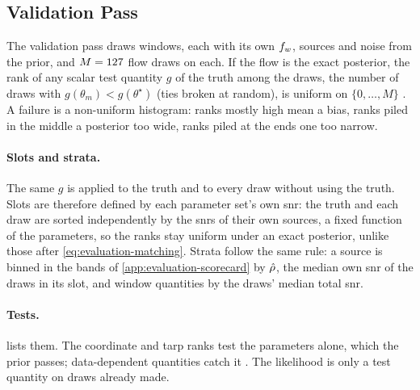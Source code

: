 \subsection{Validation Pass}
\label{app:evaluation-validation}

The validation pass draws \EvaluationValidation{} windows, each with its own $f_{w}$, sources and noise from the prior,
and $M = 127$ flow draws on each. If the flow is the exact posterior, the rank of any scalar test
quantity $g$ of the truth among the draws, the number of draws with $g(\theta_m) < g(\theta^\star)$ (ties broken at
random), is uniform on $\{0,\dots,M\}$ \citep{talts2018validating}. A failure is a non-uniform histogram: ranks mostly
high mean a bias, ranks piled in the middle a posterior too wide, ranks piled at the ends one too narrow.

\paragraph{Slots and strata.}
The same $g$ is applied to the truth and to every draw without using the truth. Slots are therefore defined by each
parameter set's own \ac{snr}: the truth and each draw are sorted independently by the \acp{snr} of their own sources, a
fixed function of the parameters, so the ranks stay uniform under an exact posterior, unlike those after
\cref{eq:evaluation-matching}. Strata follow the same rule: a source is binned in the bands of
\cref{app:evaluation-scorecard} by $\hat{\rho}$, the median own \ac{snr} of the draws in its slot, and window quantities by
the draws' median total \ac{snr}.

\paragraph{Tests.}
 lists them. The coordinate and \ac{tarp} ranks test the parameters alone, which the prior passes; data-dependent
quantities catch it \citep{modrak2023simulation}. The likelihood is only a test quantity on draws already made.

